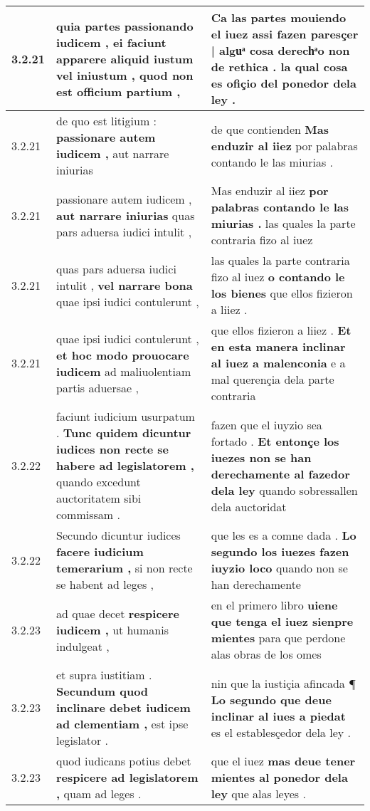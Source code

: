 \begin{tabular}{|p{1cm}|p{6.5cm}|p{6.5cm}|}
3.2.21 & quia partes passionando iudicem , \textbf{ ei faciunt apparere aliquid iustum vel iniustum , } quod non est officium partium , & Ca las partes mouiendo el iuez \textbf{ assi fazen paresçer | alguͣ cosa derechͣo non de rethica . } la qual cosa es ofiçio del ponedor dela ley . \\\hline
3.2.21 & de quo est litigium : \textbf{ passionare autem iudicem , } aut narrare iniurias & de que contienden \textbf{ Mas enduzir al iiez } por palabras contando le las miurias . \\\hline
3.2.21 & passionare autem iudicem , \textbf{ aut narrare iniurias } quas pars aduersa iudici intulit , & Mas enduzir al iiez \textbf{ por palabras contando le las miurias . } las quales la parte contraria fizo al iuez \\\hline
3.2.21 & quas pars aduersa iudici intulit , \textbf{ vel narrare bona } quae ipsi iudici contulerunt , & las quales la parte contraria fizo al iuez \textbf{ o contando le los bienes } que ellos fizieron a liiez . \\\hline
3.2.21 & quae ipsi iudici contulerunt , \textbf{ et hoc modo prouocare iudicem } ad maliuolentiam partis aduersae , & que ellos fizieron a liiez . \textbf{ Et en esta manera inclinar al iuez a malenconia } e a mal querençia dela parte contraria \\\hline
3.2.22 & faciunt iudicium usurpatum . \textbf{ Tunc quidem dicuntur iudices non recte se habere ad legislatorem , } quando excedunt auctoritatem sibi commissam . & fazen que el iuyzio sea fortado . \textbf{ Et entonçe los iuezes non se han derechamente al fazedor dela ley } quando sobressallen dela auctoridat \\\hline
3.2.22 & Secundo dicuntur iudices \textbf{ facere iudicium temerarium , } si non recte se habent ad leges , & que les es a comne dada . \textbf{ Lo segundo los iuezes fazen iuyzio loco } quando non se han derechamente \\\hline
3.2.23 & ad quae decet \textbf{ respicere iudicem , } ut humanis indulgeat , & en el primero libro \textbf{ uiene que tenga el iuez sienpre mientes } para que perdone alas obras de los omes \\\hline
3.2.23 & et supra iustitiam . \textbf{ Secundum quod inclinare debet iudicem ad clementiam , } est ipse legislator . & nin que la iustiçia afincada ¶ \textbf{ Lo segundo que deue inclinar al iues a piedat } es el establesçedor dela ley . \\\hline
3.2.23 & quod iudicans potius debet \textbf{ respicere ad legislatorem , } quam ad leges . & que el iuez \textbf{ mas deue tener mientes al ponedor dela ley } que alas leyes . \\\hline

\end{tabular}
